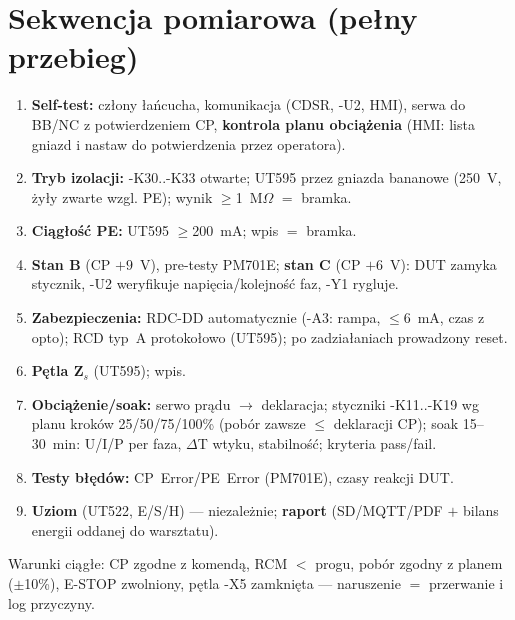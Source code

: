 \documentclass[11pt,a4paper]{article}
\newcommand{\ohm}{$\Omega$}
\begin{document}
\section{Sekwencja pomiarowa (pełny przebieg)}
\begin{enumerate}
\item \textbf{Self-test:} człony łańcucha, komunikacja (CDSR, -U2, HMI), serwa do BB/NC
z potwierdzeniem CP, \textbf{kontrola planu obciążenia} (HMI: lista gniazd i nastaw do
potwierdzenia przez operatora).
\item \textbf{Tryb izolacji:} -K30..-K33 otwarte; UT595 przez gniazda bananowe (250~V, żyły
zwarte wzgl. PE); wynik $\ge$1~M\ohm{} $=$ bramka.
\item \textbf{Ciągłość PE:} UT595 $\ge$200~mA; wpis $=$ bramka.
\item \textbf{Stan B} (CP $+9$~V), pre-testy PM701E; \textbf{stan C} (CP $+6$~V): DUT zamyka
stycznik, -U2 weryfikuje napięcia/kolejność faz, -Y1 rygluje.
\item \textbf{Zabezpieczenia:} RDC-DD automatycznie (-A3: rampa, $\le$6~mA, czas z opto);
RCD typ~A protokołowo (UT595); po zadziałaniach prowadzony reset.
\item \textbf{Pętla Z$_s$} (UT595); wpis.
\item \textbf{Obciążenie/soak:} serwo prądu $\to$ deklaracja; styczniki -K11..-K19 wg planu
kroków 25/50/75/100\% (pobór zawsze $\le$ deklaracji CP); soak 15--30~min: U/I/P per faza,
$\Delta$T wtyku, stabilność; kryteria pass/fail.
\item \textbf{Testy błędów:} CP~Error/PE~Error (PM701E), czasy reakcji DUT.
\item \textbf{Uziom} (UT522, E/S/H) --- niezależnie; \textbf{raport} (SD/MQTT/PDF $+$ bilans
energii oddanej do warsztatu).
\end{enumerate}
Warunki ciągłe: CP zgodne z komendą, RCM $<$ progu, pobór zgodny z planem ($\pm$10\%), E-STOP
zwolniony, pętla -X5 zamknięta --- naruszenie $=$ przerwanie i log przyczyny.
\end{document}
